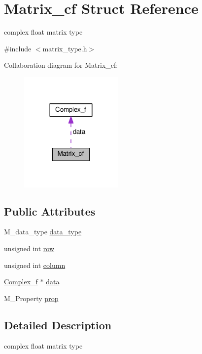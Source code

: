 \hypertarget{structMatrix__cf}{}\section{Matrix\+\_\+cf Struct Reference}
\label{structMatrix__cf}


complex float matrix type  




{\ttfamily \#include $<$matrix\+\_\+type.\+h$>$}



Collaboration diagram for Matrix\+\_\+cf\+:\nopagebreak
\begin{figure}[H]
\begin{center}
\leavevmode
\includegraphics[width=144pt]{structMatrix__cf__coll__graph}
\end{center}
\end{figure}
\subsection*{Public Attributes}
\begin{DoxyCompactItemize}
\item 
M\+\_\+data\+\_\+type \hyperlink{structMatrix__cf_a93b82c3bbbc41c942eaa7891944a1015}{data\+\_\+type}
\item 
unsigned int \hyperlink{structMatrix__cf_a78fd97baf2f96f5277a90752322fd5a0}{row}
\item 
unsigned int \hyperlink{structMatrix__cf_ac0522815facf90db76974c3db9645927}{column}
\item 
\hyperlink{structComplex__f}{Complex\+\_\+f} $\ast$ \hyperlink{structMatrix__cf_a987beffa87c0ed47d1c7b23159c8fd31}{data}
\item 
M\+\_\+\+Property \hyperlink{structMatrix__cf_ae5e94ddc0ac8bd8bebfed98f3da07484}{prop}
\end{DoxyCompactItemize}


\subsection{Detailed Description}
complex float matrix type 

